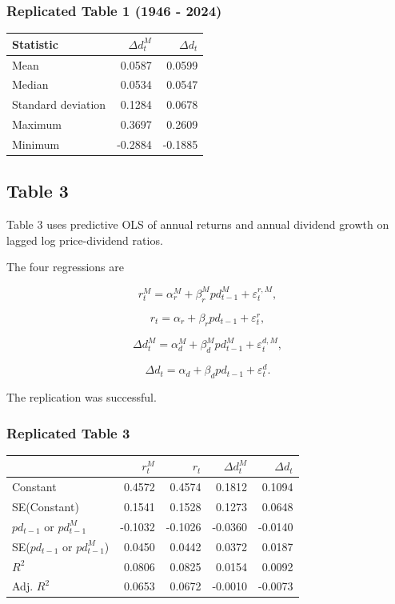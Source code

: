 \documentclass[11pt]{article}
\begin{document}
\subsubsection{Replicated Table 1 (1946 -
2024)}\label{replicated-table-1-1946---2024}

{\def\LTcaptype{none} %
\begin{longtable}[]{@{}lrr@{}}
\toprule\noalign{}
Statistic & \(\Delta d_t^M\) & \(\Delta d_t\) \\
\midrule\noalign{}
\endhead
\bottomrule\noalign{}
\endlastfoot
Mean & 0.0587 & 0.0599 \\
Median & 0.0534 & 0.0547 \\
Standard deviation & 0.1284 & 0.0678 \\
Maximum & 0.3697 & 0.2609 \\
Minimum & -0.2884 & -0.1885 \\
\end{longtable}
}

    \subsection{Table 3}\label{table-3}

Table 3 uses predictive OLS of annual returns and annual dividend growth
on lagged log price-dividend ratios.

The four regressions are

\[
r_t^M = \alpha_r^M + \beta_r^M pd_{t-1}^M + \varepsilon_t^{r,M},
\]

\[
r_t = \alpha_r + \beta_r pd_{t-1} + \varepsilon_t^{r},
\]

\[
\Delta d_t^M = \alpha_d^M + \beta_d^M pd_{t-1}^M + \varepsilon_t^{d,M},
\]

\[
\Delta d_t = \alpha_d + \beta_d pd_{t-1} + \varepsilon_t^{d}.
\]

The replication was successful.

\subsubsection{Replicated Table 3}\label{replicated-table-3}

{\def\LTcaptype{none} %
\begin{longtable}[]{@{}lrrrr@{}}
\toprule\noalign{}
& \(r_t^M\) & \(r_t\) & \(\Delta d_t^M\) & \(\Delta d_t\) \\
\midrule\noalign{}
\endhead
\bottomrule\noalign{}
\endlastfoot
Constant & 0.4572 & 0.4574 & 0.1812 & 0.1094 \\
SE(Constant) & 0.1541 & 0.1528 & 0.1273 & 0.0648 \\
\(pd_{t-1}\) or \(pd_{t-1}^M\) & -0.1032 & -0.1026 & -0.0360 &
-0.0140 \\
SE(\(pd_{t-1}\) or \(pd_{t-1}^M\)) & 0.0450 & 0.0442 & 0.0372 &
0.0187 \\
\(R^2\) & 0.0806 & 0.0825 & 0.0154 & 0.0092 \\
Adj. \(R^2\) & 0.0653 & 0.0672 & -0.0010 & -0.0073 \\
\end{longtable}
}
\end{document}

